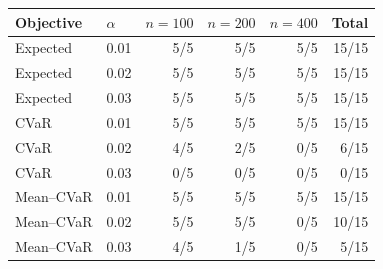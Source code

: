 \begin{tabular}{llrrrr}
\toprule
Objective & $\alpha$ & $n=100$ & $n=200$ & $n=400$ & Total \\
\midrule
Expected & 0.01 & 5/5 & 5/5 & 5/5 & 15/15 \\
Expected & 0.02 & 5/5 & 5/5 & 5/5 & 15/15 \\
Expected & 0.03 & 5/5 & 5/5 & 5/5 & 15/15 \\
\midrule
CVaR & 0.01 & 5/5 & 5/5 & 5/5 & 15/15 \\
CVaR & 0.02 & 4/5 & 2/5 & 0/5 & 6/15 \\
CVaR & 0.03 & 0/5 & 0/5 & 0/5 & 0/15 \\
\midrule
Mean--CVaR & 0.01 & 5/5 & 5/5 & 5/5 & 15/15 \\
Mean--CVaR & 0.02 & 5/5 & 5/5 & 0/5 & 10/15 \\
Mean--CVaR & 0.03 & 4/5 & 1/5 & 0/5 & 5/15 \\
\bottomrule
\end{tabular}
